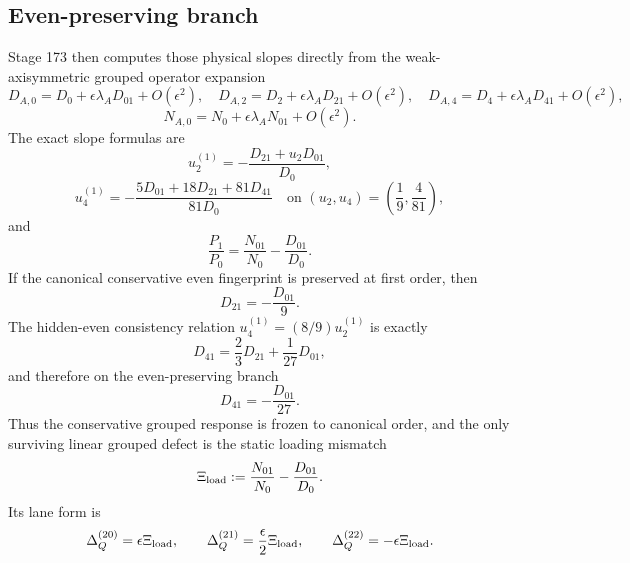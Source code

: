 \subsection{Even-preserving branch}
Stage 173 then computes those physical slopes directly from the weak-axisymmetric grouped operator expansion
\begin{equation}
\label{eq:app-part05-DN-expansion}
D_{A,0}=D_0+\epsilon\lambda_AD_{01}+O(\epsilon^2),
\quad
D_{A,2}=D_2+\epsilon\lambda_AD_{21}+O(\epsilon^2),
\quad
D_{A,4}=D_4+\epsilon\lambda_AD_{41}+O(\epsilon^2),
\end{equation}
\begin{equation}
\label{eq:app-part05-N-expansion}
N_{A,0}=N_0+\epsilon\lambda_AN_{01}+O(\epsilon^2).
\end{equation}
The exact slope formulas are
\begin{equation}
\label{eq:app-part05-physical-slopes-stage173}
u_2^{(1)}=-\frac{D_{21}+u_2D_{01}}{D_0},
\end{equation}
\begin{equation}
\label{eq:app-part05-u4-slope-stage173}
u_4^{(1)}
=-\frac{5D_{01}+18D_{21}+81D_{41}}{81D_0}
\quad
\text{on }(u_2,u_4)=\left(\frac19,\frac{4}{81}\right),
\end{equation}
and
\begin{equation}
\label{eq:app-part05-P1P0-stage173}
\frac{P_1}{P_0}
=
\frac{N_{01}}{N_0}-\frac{D_{01}}{D_0}.
\end{equation}
If the canonical conservative even fingerprint is preserved at first order, then
\begin{equation}
\label{eq:app-part05-even-preserving-D21}
D_{21}=-\frac{D_{01}}{9}.
\end{equation}
The hidden-even consistency relation \(u_4^{(1)}=(8/9)u_2^{(1)}\) is exactly
\begin{equation}
\label{eq:app-part05-hidden-even-D41-general}
D_{41}=\frac23D_{21}+\frac{1}{27}D_{01},
\end{equation}
and therefore on the even-preserving branch
\begin{equation}
\label{eq:app-part05-even-preserving-D41}
D_{41}=-\frac{D_{01}}{27}.
\end{equation}
Thus the conservative grouped response is frozen to canonical order, and the only surviving linear grouped defect is the static loading mismatch
\begin{equation}
\label{eq:app-part05-Xiload-def}
\Xi_{\rm load}
:=
\frac{N_{01}}{N_0}-\frac{D_{01}}{D_0}.
\end{equation}
Its lane form is
\begin{equation}
\label{eq:app-part05-Xiload-lanes}
\Delta_Q^{(20)}=\epsilon\Xi_{\rm load},
\qquad
\Delta_Q^{(21)}=\frac{\epsilon}{2}\Xi_{\rm load},
\qquad
\Delta_Q^{(22)}=-\epsilon\Xi_{\rm load}.
\end{equation}

